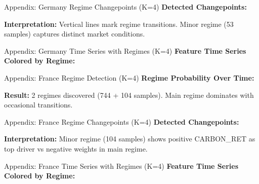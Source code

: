 \documentclass[aspectratio=169]{beamer}
\begin{document}
\begin{frame}{Appendix: Germany Regime Changepoints (K=4)}
\textbf{Detected Changepoints:}
\begin{center}

\end{center}
\vspace{0.1cm}
\textbf{Interpretation:} Vertical lines mark regime transitions. Minor regime (53 samples) captures distinct market conditions.
\end{frame}

\begin{frame}{Appendix: Germany Time Series with Regimes (K=4)}
\textbf{Feature Time Series Colored by Regime:}
\begin{center}

\end{center}
\end{frame}

\begin{frame}{Appendix: France Regime Detection (K=4)}
\textbf{Regime Probability Over Time:}
\begin{center}

\end{center}
\vspace{0.1cm}
\textbf{Result:} 2 regimes discovered (744 + 104 samples). Main regime dominates with occasional transitions.
\end{frame}

\begin{frame}{Appendix: France Regime Changepoints (K=4)}
\textbf{Detected Changepoints:}
\begin{center}

\end{center}
\vspace{0.1cm}
\textbf{Interpretation:} Minor regime (104 samples) shows \textcolor{reprogreen}{positive CARBON\_RET} as top driver vs negative weights in main regime.
\end{frame}

\begin{frame}{Appendix: France Time Series with Regimes (K=4)}
\textbf{Feature Time Series Colored by Regime:}
\begin{center}

\end{center}
\end{frame}
\end{document}
